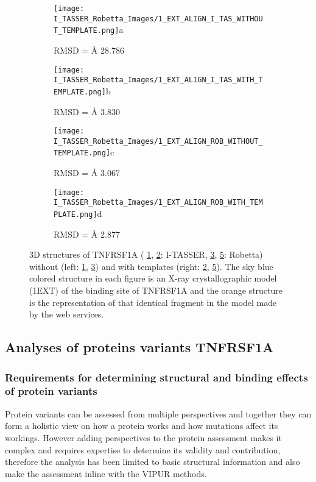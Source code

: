 	\begin{figure}[!ht]
		\centering
		\begin{subfigure}{0.45\textwidth}
			\texttt{[image: I\_TASSER\_Robetta\_Images/1\_EXT\_ALIGN\_I\_TAS\_WITHOUT\_TEMPLATE.png]}{a}
			\caption{RMSD = {\AA} 28.786}
			\label{fig:RES_I_TASSER_Without}
		\end{subfigure}
		\begin{subfigure}{0.45\textwidth}
			\texttt{[image: I\_TASSER\_Robetta\_Images/1\_EXT\_ALIGN\_I\_TAS\_WITH\_TEMPLATE.png]}{b}
			\caption{RMSD = {\AA} 3.830}
			\label{fig:RES_I_TASSER_With}
		\end{subfigure}
		\begin{subfigure}{0.45\textwidth}
			\texttt{[image: I\_TASSER\_Robetta\_Images/1\_EXT\_ALIGN\_ROB\_WITHOUT\_TEMPLATE.png]}{c}
			\caption{RMSD =  {\AA} 3.067}
			\label{fig:RES_Robetta_Without}
		\end{subfigure}
		\begin{subfigure}{0.45\textwidth}
			\texttt{[image: I\_TASSER\_Robetta\_Images/1\_EXT\_ALIGN\_ROB\_WITH\_TEMPLATE.png]}{d}
			\caption{RMSD =  {\AA} 2.877}
			\label{fig:RES_Robetta_With}
		\end{subfigure}
		\caption[I-TASSER and Robetta models with and without templates]{3D structures of TNFRSF1A ( \ref{fig:RES_I_TASSER_Without}, \ref{fig:RES_I_TASSER_With}: I-TASSER, \ref{fig:RES_Robetta_Without}, \ref{fig:RES_Robetta_With}: Robetta) without (left: \ref{fig:RES_I_TASSER_Without}, \ref{fig:RES_Robetta_Without}) and with templates (right: \ref{fig:RES_I_TASSER_With}, \ref{fig:RES_Robetta_With}). The sky blue colored structure in each figure is an X-ray crystallographic model (1EXT) of the binding site of TNFRSF1A and the orange structure is the representation of that identical fragment in the model made by the web services.}
	\end{figure}
	\label{subsubsec:RES_Expanding_Models}

\newpage
\subsection{Analyses of proteins variants TNFRSF1A}
	\subsubsection{Requirements for determining structural and binding effects of protein variants}
	Protein variants can be assessed from multiple perspectives and together they can form a holistic view on how a protein works and how mutations affect its workings. However adding perspectives to the protein assessment makes it complex and requires expertise to determine its validity and contribution, therefore the analysis has been limited to basic structural information and also make the assessment inline with the VIPUR methods.
	
